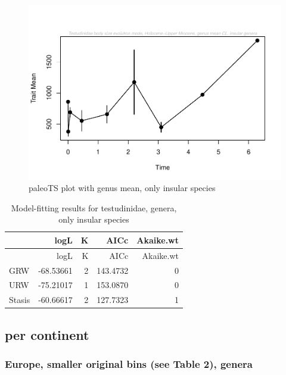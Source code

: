 \documentclass[]{article}
\begin{document}
\begin{figure}[htbp]
\centering
\includegraphics{MA_JJ_files/figure-latex/paleoTS plot with genus mean, excluding continental species-1.pdf}
\caption{paleoTS plot with genus mean, only insular species}
\end{figure}

\begin{longtable}[]{@{}lrrrr@{}}
\caption{Model-fitting results for testudinidae, genera, only insular
species}\tabularnewline
\toprule
& logL & K & AICc & Akaike.wt\tabularnewline
\midrule
\endfirsthead
\toprule
& logL & K & AICc & Akaike.wt\tabularnewline
\midrule
\endhead
GRW & -68.53661 & 2 & 143.4732 & 0\tabularnewline
URW & -75.21017 & 1 & 153.0870 & 0\tabularnewline
Stasis & -60.66617 & 2 & 127.7323 & 1\tabularnewline
\bottomrule
\end{longtable}

\newpage

\subsection{per continent}\label{per-continent}

\subsubsection{Europe, smaller original bins (see Table 2),
genera}\label{europe-smaller-original-bins-see-table-2-genera}
\end{document}
